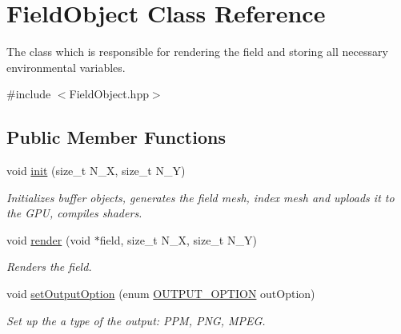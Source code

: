 \hypertarget{class_field_object}{}\section{Field\+Object Class Reference}
\label{class_field_object}


The class which is responsible for rendering the field and storing all necessary environmental variables.  




{\ttfamily \#include $<$Field\+Object.\+hpp$>$}

\subsection*{Public Member Functions}
\begin{DoxyCompactItemize}
\item 
void \hyperlink{class_field_object_a92a55f8d93bc37fd81d4b157b43fc1f6}{init} (size\+\_\+t N\+\_\+X, size\+\_\+t N\+\_\+Y)
\begin{DoxyCompactList}\small\item\em Initializes buffer objects, generates the field mesh, index mesh and uploads it to the G\+PU, compiles shaders. \end{DoxyCompactList}\item 
void \hyperlink{class_field_object_a4dc838b4ac4ee2e11ec0ebafad7b9d1e}{render} (void $\ast$field, size\+\_\+t N\+\_\+X, size\+\_\+t N\+\_\+Y)
\begin{DoxyCompactList}\small\item\em Renders the field. \end{DoxyCompactList}\item 
void \hyperlink{class_field_object_af3ad1cf11c7033def6ea707dc39bf3dd}{set\+Output\+Option} (enum \hyperlink{offscreen_8h_a29ac838d689ab5ed87b591138936e615}{O\+U\+T\+P\+U\+T\+\_\+\+O\+P\+T\+I\+ON} out\+Option)
\begin{DoxyCompactList}\small\item\em Set up the a type of the output\+: P\+PM, P\+NG, M\+P\+EG. \end{DoxyCompactList}\end{DoxyCompactItemize}
